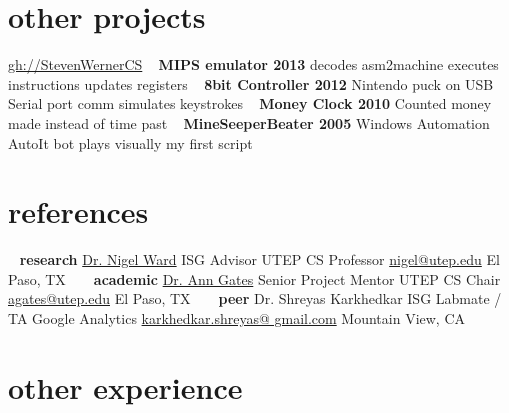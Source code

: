 \documentclass[]{friggeri-cv} %
\begin{document}
\newpage
\clearpage
\begin{aside2}
\section{other projects}
\href{http://www.github.com/StevenWernerCS/}{gh://StevenWernerCS}
~
\textbf{MIPS emulator 2013}
decodes asm2machine
executes instructions
updates registers
~
\textbf{8bit Controller 2012}
Nintendo puck on USB
Serial port comm
simulates keystrokes
~
\textbf{Money Clock 2010}
Counted money made
instead of time past
~
\textbf{MineSeeperBeater 2005}
Windows Automation
AutoIt bot plays visually
my first script
~
~
\section{references}
~
\textbf{research}
\href{http://www.cs.utep.edu/nigel/}{Dr. Nigel Ward}
ISG Advisor
UTEP CS Professor
\href{mailto:nigel@utep.edu}{nigel@utep.edu}
El Paso, TX
~
~
\textbf{academic}
\href{http://www.cs.utep.edu/agates/}{Dr. Ann Gates}
Senior Project Mentor
UTEP CS Chair
\href{mailto:agates@utep.edu}{agates@utep.edu}
El Paso, TX
~
~
\textbf{peer}
Dr. Shreyas Karkhedkar
ISG Labmate / TA
Google Analytics
\href{mailto:karkhedkar.shreyas@gmail.com}{karkhedkar.shreyas@
gmail.com}
Mountain View, CA
\end{aside2}



\section{other experience}
\end{document}
